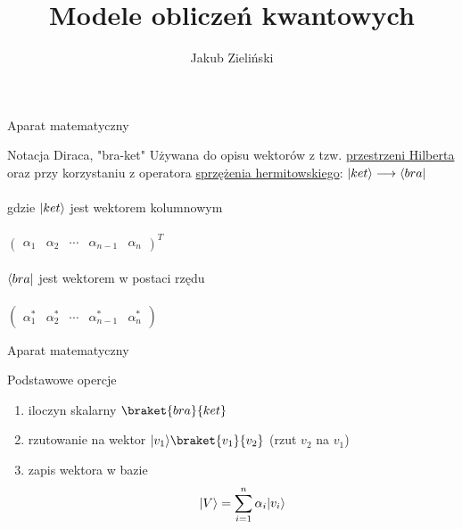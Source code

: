 \documentclass{beamer}
\title{Modele obliczeń kwantowych}
\author{Jakub Zieliński}
\institute{Wydział Elektroniki i Technik Informacyjnych\\ Politechnika Warszawska}
\date{}
\DeclarePairedDelimiter\bra{\langle}{\rvert}
\DeclarePairedDelimiter\ket{\lvert}{\rangle}
\begin{document}
	
	
	\begin{frame}
	\titlepage
	\end{frame}
	
	\begin{frame}{Aparat matematyczny}
		
		\begin{block}{Notacja Diraca, "bra-ket"}
			\vspace{0.5em}
			Używana do opisu wektorów z tzw. \href{https://en.wikipedia.org/wiki/Hilbert_space}{przestrzeni Hilberta} oraz przy korzystaniu z operatora \href{https://en.wikipedia.org/wiki/Conjugate_transpose}{sprzężenia hermitowskiego}:
			 $\ket{ket}\longrightarrow\bra{bra}$ 
			\\~\\
			gdzie $\ket{ket}$ jest wektorem kolumnowym \\~\\
			\centering
			$
			\begin{pmatrix}
			\alpha_{1} &\alpha_{2} & \cdots &\alpha_{n-1} &\alpha_{n} 
			\end{pmatrix}
			^{T}
			$\\~\\
			\flushleft
			$\bra{bra}$ jest wektorem w postaci rzędu\\~\\ 
			\centering
			$
			\begin{pmatrix}
			\alpha_{1}^{\ast} &\alpha_{2}^{\ast} & \cdots &\alpha_{n-1}^{\ast} &\alpha_{n}^{\ast} 
			\end{pmatrix}
			$
			\vspace{0.5em}
		\end{block}
	\end{frame}	

	\begin{frame}{Aparat matematyczny}
		\begin{block}{Podstawowe opercje}
			\vspace{0.5em}
			\begin{enumerate}
				\item iloczyn skalarny $\braket{bra}{ket}$
				\item rzutowanie na wektor $\ket{v_{1}}\braket{v_{1}}{v_{2}}$ (rzut $v_{2}$ na $v_{1}$)
				\item zapis wektora w bazie $$\ket{V} = \sum\limits_{i=1}^n \alpha_{i}\ket{v_{i}}$$
			\end{enumerate}	
			\vspace{0.5em}
		\end{block}
	\end{frame}
	
\end{document}
